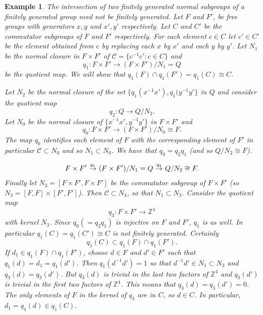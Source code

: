 \documentclass[12pt]{article}
\newtheorem{example}[theorem]{Example}
\begin{document}
\begin{example} 
The intersection of two finitely generated normal subgroups of a finitely generated group need not be finitely generated. Let $F$ and $ F'$, be free groups with generators $x,y$ and $x',y'$ respectively. Let $C$ and $C'$ be the commutator subgroups of $F$ and $F'$ respectively. For each element $c\in C$ let $c'\in C'$ be the element obtained from $c$ by replacing each $x$ by $x'$ and each $y$ by $y'$. Let $N_1$ be the normal closure in $F\times F'$ of $\mathcal C=\{c^{-1}c':c\in C\}$ and 
$$q_1:F\times F'\to (F\times F')/N_1=Q$$ 
be the quotient map. We will show that $q_1(F)\cap q_1(F')=q_1(C)\cong C$. 

Let $N_2$ be the normal closure of the set $\{q_1(x^{-1}x'), q_1(y^{-1}y'\}$ in $Q$ and consider the quotient map
$$q_2:Q\to Q/N_2.$$
Let $N_0$ be the normal closure of $\{x^{-1}x', y^{-1}y'\}$ in $F\times F'$ and 
$$q_0:F\times F'\to (F\times F')/N_0\cong F.$$ 
The map $q_0$ identifies each element of $F$ with the corresponding element of $F'$ in particular $\mathcal C\subset N_0$ and so $N_1\subset N_0$. We have that $q_0=q_2q_1$ (and so  $Q/N_2\cong F$).


$$F\times F' \ {\buildrel q_1\over \to}\  (F\times F')/N_1=Q\ {\buildrel q_2\over \to}\  Q/N_2\cong F.$$
Finally let $N_3=[F\times F',F\times F']$ be the commutator subgroup of $F\times F'$ (so $N_3=[F,F]\times [F',F']$). Then $\mathcal C\subset N_3$, so that $N_1\subset N_3$. Consider the quotient map 
$$q_3:F\times F'\to \mathbb Z^4$$
with kernel $N_3$. 
Since $q_0(=q_2q_1)$ is injective on $F$ and $F'$, $q_1$ is as well. In particular $q_1(C)=q_1(C')\cong C$ is not finitely generated.
 Certainly 
 $$q_1(C)\subset q_1(F)\cap q_1(F').$$ 
 If $d_1\in q_1(F)\cap q_1(F')$, choose $d\in F$ and $d'\in F'$ such that $q_1(d)=d_1=q_1(d')$. Then $q_1(d^{-1}d')=1$ so that $d^{-1}d'\in N_1\subset N_3$ and $q_3(d)=q_3(d')$. But $q_3(d)$ is trivial in the last two factors of $\mathbb Z^4$ and $q_3(d')$ is trivial in the first two factors of $\mathbb Z^4$. This means that $q_3(d)=q_3(d')=0$. The only elements of $F$ in the kernel of $q_3$ are in $C$, so $d\in C$. In particular, $d_1=q_1(d)\in q_1(C)$.
\end{example}

\end{document}
